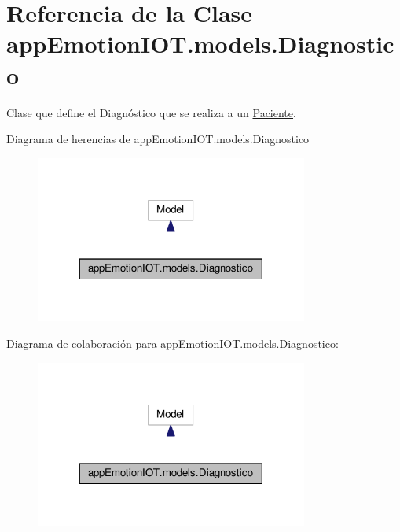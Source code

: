 \hypertarget{classappEmotionIOT_1_1models_1_1Diagnostico}{}\section{Referencia de la Clase app\+Emotion\+I\+O\+T.\+models.\+Diagnostico}
\label{classappEmotionIOT_1_1models_1_1Diagnostico}


Clase que define el Diagnóstico que se realiza a un \hyperlink{classappEmotionIOT_1_1models_1_1Paciente}{Paciente}.  




Diagrama de herencias de app\+Emotion\+I\+O\+T.\+models.\+Diagnostico
\nopagebreak
\begin{figure}[H]
\begin{center}
\leavevmode
\includegraphics[width=254pt]{classappEmotionIOT_1_1models_1_1Diagnostico__inherit__graph}
\end{center}
\end{figure}


Diagrama de colaboración para app\+Emotion\+I\+O\+T.\+models.\+Diagnostico\+:
\nopagebreak
\begin{figure}[H]
\begin{center}
\leavevmode
\includegraphics[width=254pt]{classappEmotionIOT_1_1models_1_1Diagnostico__coll__graph}
\end{center}
\end{figure}
